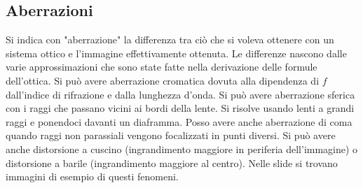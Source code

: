 \subsection{Aberrazioni}
Si indica con "aberrazione" la differenza tra ciò che si voleva ottenere con un sistema ottico e l'immagine effettivamente ottenuta. Le differenze nascono dalle varie approssimazioni che sono state fatte nella derivazione delle formule dell'ottica. Si può avere aberrazione cromatica dovuta alla dipendenza di \(f\) dall'indice di rifrazione e dalla lunghezza d'onda. Si può avere aberrazione sferica con i raggi che passano vicini ai bordi della lente. Si risolve usando lenti a grandi raggi e ponendoci davanti un diaframma. Posso avere anche aberrazione di coma quando raggi non parassiali vengono focalizzati in punti diversi. Si può avere anche distorsione a cuscino (ingrandimento maggiore in periferia dell'immagine) o distorsione a barile (ingrandimento maggiore al centro). Nelle slide si trovano immagini di esempio di questi fenomeni.